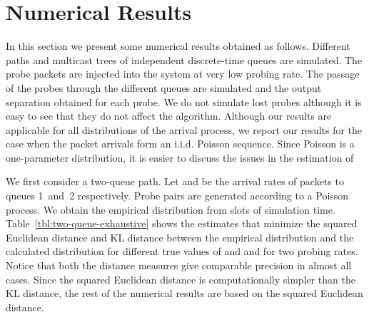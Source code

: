\documentclass[11pt]{article}
\begin{document}
\section{Numerical Results}
\label{sec:numerical-results}
In this section we present some numerical results obtained as follows.
Different paths and multicast trees of independent discrete-time
queues are simulated. The probe packets are injected into the system
at very low probing rate. The passage of the probes through the
different queues are simulated and the output separation obtained for
each probe. We do not simulate lost probes although it is easy to see
that they do not affect the algorithm.
Although our results are
applicable for all distributions of the arrival process, we report our
results for the case when the packet arrivals form an i.i.d. Poisson
sequence.  Since Poisson is a one-parameter distribution, it is easier
to discuss the issues in the estimation of 

We first consider a two-queue path. Let  and  be
the arrival rates of packets to queues 1~and~2 respectively. Probe
pairs are generated according to a Poisson process. We obtain the
empirical distribution from  slots of simulation time.
Table~\ref{tbl:two-queue-exhaustive} shows the estimates that minimize
the squared Euclidean distance and KL distance between the empirical
distribution and the calculated distribution for different true values
of  and  and for two probing rates.  Notice that
both the distance measures give comparable precision in almost all
cases. Since the squared Euclidean distance is computationally simpler
than the KL distance, the rest of the numerical results are based on
the squared Euclidean distance.
\end{document}
